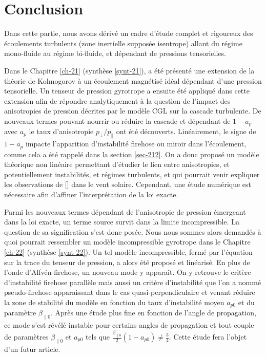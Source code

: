 \chapter*{Conclusion}
 \adjustmtc
\renewcommand\partie{\Partie\ CONCLUSION}
\label{ch-24}

	
\bigskip
\minitoc  

Dans cette partie, nous avons dérivé un cadre d'étude complet et rigoureux des écoulements turbulents (zone inertielle supposée isentrope) allant du régime mono-fluide au régime bi-fluide, et dépendant de pressions tensorielles. 

Dans le Chapitre \ref{ch-21} (synthèse \ref{synt-21}), a été présenté une extension de la théorie de Kolmogorov à un écoulement magnétisé idéal dépendant d'une pression tensorielle. Un tenseur de pression gyrotrope a ensuite été appliqué dans cette extension afin de répondre analytiquement à la question de l'impact des anisotropies de pression décrites par le modèle \ac{CGL} sur la cascade turbulente. De nouveaux termes pouvant nourrir ou réduire la cascade et dépendant de $1-a_p$ avec $a_p$ le taux d'anisotropie $p_{\perp}/p_{\parallel}$ ont été découverts. Linéairement, le signe de $1-a_p$ impacte l'apparition d'instabilité firehose ou miroir dans l'écoulement, comme cela a été rappelé dans la section \ref{sec-212}. On a donc proposé un modèle théorique non linéaire permettant d'étudier le lien entre anisotropies, et potentiellement instabilités, et régimes turbulents, et qui pourrait venir expliquer les observations de [\cite{osman_proton_2013, hadid_compressible_2018}] dans le vent solaire. Cependant, une étude numérique est nécessaire afin d'affiner l'interprétation de la loi exacte. 

Parmi les nouveaux termes dépendant de l'anisotropie de pression émergeant dans la loi exacte, un terme source survit dans la limite incompressible. La question de sa signification s'est donc posée. Nous nous sommes alors demandés à quoi pourrait ressembler un modèle incompressible gyrotrope dans le Chapitre \ref{ch-22} (synthèse \ref{synt-22}). Un tel modèle incompressible, fermé par l'équation sur la trace du tenseur de pression, a alors été proposé et linéarisé. En plus de l'onde d'Alfvén-firehose, un nouveau mode y apparaît. On y retrouve le critère d'instabilité firehose parallèle mais aussi un critère d'instabilité que l'on a nommé pseudo-firehose apparaissant dans le cas quasi-perpendiculaire et venant réduire la zone de stabilité du modèle en fonction du taux d'instabilité moyen $a_{p0}$ et du paramètre $\beta_{\parallel 0}$. Après une étude plus fine en fonction de l'angle de propagation, ce mode s'est révélé instable pour certains angles de propagation et tout couple de paramètres $\beta_{\parallel 0}$ et $a_{p0}$ tels que $\frac{\beta_{\parallel 0}}{2}\left(1-a_{p0}\right) \neq \frac{3}{4}$. 
Cette étude fera l'objet d'un futur article. 


